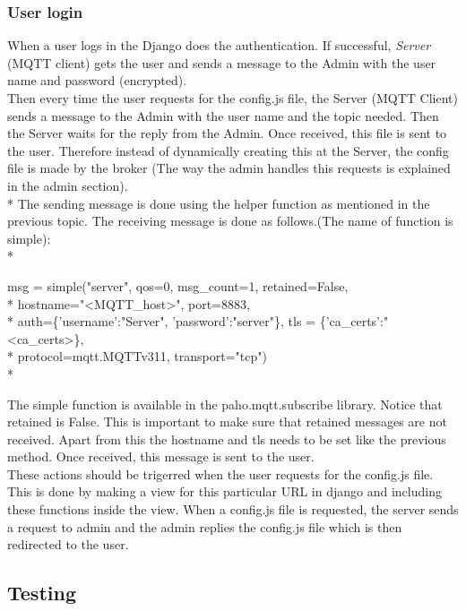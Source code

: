 \documentclass{report}
\begin{document}
\subsubsection{User login}
When a user logs in the Django does the authentication. If successful, \textit{Server} (MQTT client) gets the user and sends a message to the Admin with the user name and password (encrypted).\\

Then every time the user requests for the config.js file, the Server (MQTT Client) sends a message to the Admin with the user name and the topic needed. Then the Server waits for the reply from the Admin. Once received, this file is sent to the user. Therefore instead of dynamically creating this at the Server, the config file is made by the broker (The way the admin handles this requests is explained in the admin section).\\*
The sending message is done using the helper function as mentioned in the previous topic. The receiving message is done as follows.(The name of function is simple):\\*

msg = simple("server", qos=0, msg\_count=1, retained=False,\\*
\hspace*{1cm}hostname="<MQTT\_host>", port=8883,\\*
\hspace*{1cm}auth=\{'username':"Server", 'password':"server"\}, tls = \{'ca\_certs':"<ca\_certs>\},\\*
\hspace*{1cm}protocol=mqtt.MQTTv311, transport="tcp")\\*

The simple function is available in the paho.mqtt.subscribe library. Notice that retained is False. This is important to make sure that retained messages are not received. Apart from this the hostname and tls needs to be set like the previous method. Once received, this message is sent to the user.\\

These actions should be trigerred when the user requests for the config.js file. This is done by making a view for this particular URL in django and including these functions inside the view. When a config.js file is requested, the server sends a request to admin and the admin replies the config.js file which is then redirected to the user.


\subsection{Testing}                %
\end{document}
